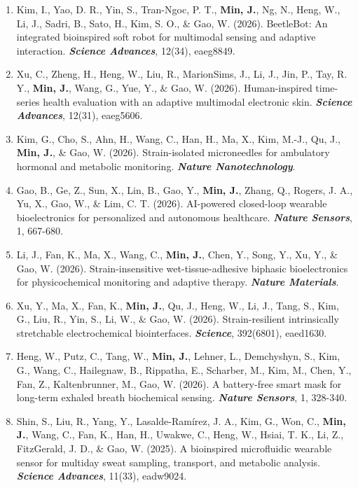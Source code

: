 \documentclass[11pt,a4paper]{article}
\begin{document}
\begin{enumerate}[leftmargin=*, itemsep=2pt, parsep=0pt, topsep=2pt]
  \item Kim, I., Yao, D. R., Yin, S., Tran-Ngoc, P. T., \textbf{Min, J.}, Ng, N., Heng, W., Li, J., Sadri, B., Sato, H., Kim, S. O., \& Gao, W. (2026). BeetleBot: An integrated bioinspired soft robot for multimodal sensing and adaptive interaction. \textbf{\textit{Science Advances}}, 12(34), eaeg8849.
  \item Xu, C., Zheng, H., Heng, W., Liu, R., MarionSims, J., Li, J., Jin, P., Tay, R. Y., \textbf{Min, J.}, Wang, G., Yue, Y., \& Gao, W. (2026). Human-inspired time-series health evaluation with an adaptive multimodal electronic skin. \textbf{\textit{Science Advances}}, 12(31), eaeg5606.
  \item Kim, G., Cho, S., Ahn, H., Wang, C., Han, H., Ma, X., Kim, M.-J., Qu, J., \textbf{Min, J.}, \& Gao, W. (2026). Strain-isolated microneedles for ambulatory hormonal and metabolic monitoring. \textbf{\textit{Nature Nanotechnology}}.
  \item Gao, B., Ge, Z., Sun, X., Lin, B., Gao, Y., \textbf{Min, J.}, Zhang, Q., Rogers, J. A., Yu, X., Gao, W., \& Lim, C. T. (2026). AI-powered closed-loop wearable bioelectronics for personalized and autonomous healthcare. \textbf{\textit{Nature Sensors}}, 1, 667-680.
  \item Li, J., Fan, K., Ma, X., Wang, C., \textbf{Min, J.}, Chen, Y., Song, Y., Xu, Y., \& Gao, W. (2026). Strain-insensitive wet-tissue-adhesive biphasic bioelectronics for physicochemical monitoring and adaptive therapy. \textbf{\textit{Nature Materials}}.
  \item Xu, Y., Ma, X., Fan, K., \textbf{Min, J.}, Qu, J., Heng, W., Li, J., Tang, S., Kim, G., Liu, R., Yin, S., Li, W., \& Gao, W. (2026). Strain-resilient intrinsically stretchable electrochemical biointerfaces. \textbf{\textit{Science}}, 392(6801), eaed1630.
  \item Heng, W., Putz, C., Tang, W., \textbf{Min, J.}, Lehner, L., Demchyshyn, S., Kim, G., Wang, C., Hailegnaw, B., Rippatha, E., Scharber, M., Kim, M., Chen, Y., Fan, Z., Kaltenbrunner, M., Gao, W. (2026). A battery-free smart mask for long-term exhaled breath biochemical sensing. \textbf{\textit{Nature Sensors}}, 1, 328-340.
  \item Shin, S., Liu, R., Yang, Y., Lasalde-Ramírez, J. A., Kim, G., Won, C., \textbf{Min, J.}, Wang, C., Fan, K., Han, H., Uwakwe, C., Heng, W., Hsiai, T. K., Li, Z., FitzGerald, J. D., \& Gao, W. (2025). A bioinspired microfluidic wearable sensor for multiday sweat sampling, transport, and metabolic analysis. \textbf{\textit{Science Advances}}, 11(33), eadw9024.

\end{enumerate}
\end{document}
